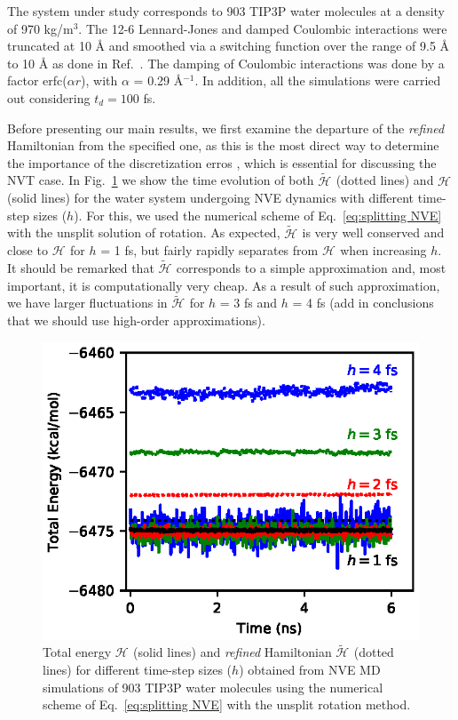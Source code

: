 \documentclass[
journal=jctcce,
layout=twocolumn
]{achemso}
\newcommand{\Ham}[1]{{\mathcal H}_\text{#1}}    %
\newcommand{\timestep}{h}
\newcommand{\modified}[1]{\widetilde{#1}}
\begin{document}
The system under study corresponds to 903 TIP3P\cite{Jorgensen_1983} water molecules at a density of 970 kg/m$^3$.
The 12-6 Lennard-Jones and damped Coulombic interactions were truncated at  10 {\AA} and smoothed via a switching function over the range of 9.5 {\AA} to  10 {\AA} as done in Ref.~. 
The damping of Coulombic interactions was done by a factor erfc($\alpha r$), with $\alpha$ = 0.29 {\AA}$^{-1}$.
In addition, all the simulations were carried out considering $t_d = 100$ fs.

Before presenting our main results, we first examine the departure of the \textit{refined} Hamiltonian from the specified one, as this is the most direct way to determine the importance of the discretization erros \cite{Engle_2005}, which is essential for discussing the NVT case. In Fig.~\ref{fig:nve} we show the time evolution of both $\modified{\Ham{}}$ (dotted lines) and $\Ham{}$ (solid lines) for the water system undergoing NVE dynamics with different time-step sizes ($\timestep$). For this, we used the numerical scheme of Eq.~\ref{eq:splitting NVE} with the unsplit solution of rotation. As expected, $\modified{\Ham{}}$ is very well conserved and close to $\Ham{}$ for $\timestep$ = 1 fs, but fairly rapidly separates from $\Ham{}$ when increasing $\timestep$. 
It should be remarked that $\modified{\Ham{}}$ corresponds to a simple approximation and, most important, it is computationally very cheap. As a result of such approximation, we have larger fluctuations in $\modified{\Ham{}}$ for $\timestep$ = 3 fs and $\timestep$ = 4 fs (add in conclusions that we should use high-order approximations).

\begin{figure}
	\includegraphics{Figures/NVE.eps}
	\caption{Total energy $\Ham{}$ (solid lines) and \textit{refined} Hamiltonian $\modified{\Ham{}}$ (dotted lines) for different time-step sizes ($\timestep$) obtained from NVE MD simulations of 903 TIP3P\cite{Jorgensen_1983} water molecules using the numerical scheme of Eq.~\ref{eq:splitting NVE} with the unsplit rotation method.}
	\label{fig:nve}
\end{figure}
\end{document}
